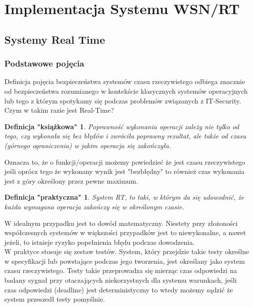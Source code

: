 \section{Implementacja Systemu WSN/RT}

\newtheorem{rt_book_def}{Definicja "książkowa"}[section]
\newtheorem{rt_practic_def}{Definicja "praktyczna"}[section]
\subsection{Systemy Real Time}
\subsubsection{Podstawowe pojęcia}

\par
\tab Definicja pojęcia bezpieczeństwa systemów czasu rzeczywistego odbiega znacznie od  bezpieczeństwa rozumianego w kontekście klasycznych systemów operacyjnych lub tego z którym spotykamy się podczas problemów związanych z IT-Security. \\
Czym w takim razie jest Real-Time?

\begin{rt_book_def}
Poprawność wykonania operacji
zależy nie tylko od tego, czy
wykonała się bez błędów i zwróciła
poprawny rezultat, ale także od czasu
(górnego ograniczenia) w jakim
operacja się zakończyła.
\end{rt_book_def}

Oznacza to, że o funkcji/operacji możemy powiedzieć że jest czasu rzeczywistego jeśli oprócz tego że wykonany wynik jest "bezbłędny" to również czas wykonania jest z góry określony przez pewne maximum. 

\begin{rt_practic_def}
System RT, to taki, w którym da się
udowodnić, że każda wymagana
operacja zakończy się w określonym
czasie.
\end{rt_practic_def}

W idealnym przypadku jest to dowód matematyczny. Niestety
przy złożoności współczesnych systemów w większości przypadków jest to niewykonalne,
a nawet jeżeli, to istnieje ryzyko popełnienia błędu podczas
dowodzenia. \\
\tab W praktyce stosuje się zestaw testów. System, który przejdzie
takie testy określne w specyfikacji lub powstające podczas jego
tworzenia, jest określany jako system czasu rzeczywistego. 
Testy takie przeprowadza się mierząc czas odpowiedzi na badany sygnał przy otaczających
niekorzystnych dla systemu warunkach, jeśli czas odpowiedzi (deadline) jest deterministyczny to wtedy możemy sądzić że system przeszedł testy pomyślnie.\\

